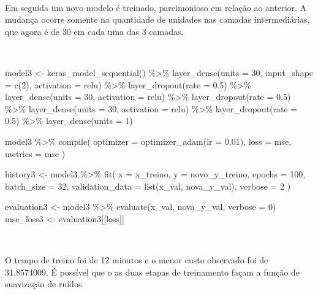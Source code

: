 \documentclass[
  a4paperpaper,
]{article}
\newenvironment{Shaded}{\begin{snugshade}}{\end{snugshade}}
\newcommand{\AttributeTok}[1]{\textcolor[rgb]{0.40,0.45,0.13}{#1}}
\newcommand{\DecValTok}[1]{\textcolor[rgb]{0.68,0.00,0.00}{#1}}
\newcommand{\FloatTok}[1]{\textcolor[rgb]{0.68,0.00,0.00}{#1}}
\newcommand{\FunctionTok}[1]{\textcolor[rgb]{0.28,0.35,0.67}{#1}}
\newcommand{\NormalTok}[1]{\textcolor[rgb]{0.00,0.23,0.31}{#1}}
\newcommand{\OtherTok}[1]{\textcolor[rgb]{0.00,0.23,0.31}{#1}}
\newcommand{\SpecialCharTok}[1]{\textcolor[rgb]{0.37,0.37,0.37}{#1}}
\newcommand{\StringTok}[1]{\textcolor[rgb]{0.13,0.47,0.30}{#1}}
\begin{document}
~

Em seguida um novo modelo é treinado, parcimonioso em relação ao
anterior. A mudança ocorre somente na quantidade de unidades nas camadas
intermediárias, que agora é de 30 em cada uma das 3 camadas.

~

\begin{Shaded}
\begin{Highlighting}[]
\NormalTok{model3 }\OtherTok{\textless{}{-}} \FunctionTok{keras\_model\_sequential}\NormalTok{() }\SpecialCharTok{\%\textgreater{}\%}
  \FunctionTok{layer\_dense}\NormalTok{(}\AttributeTok{units =} \DecValTok{30}\NormalTok{, }\AttributeTok{input\_shape =} \FunctionTok{c}\NormalTok{(}\DecValTok{2}\NormalTok{), }\AttributeTok{activation =} \StringTok{\textquotesingle{}relu\textquotesingle{}}\NormalTok{) }\SpecialCharTok{\%\textgreater{}\%}
  \FunctionTok{layer\_dropout}\NormalTok{(}\AttributeTok{rate =} \FloatTok{0.5}\NormalTok{) }\SpecialCharTok{\%\textgreater{}\%}  
  \FunctionTok{layer\_dense}\NormalTok{(}\AttributeTok{units =} \DecValTok{30}\NormalTok{, }\AttributeTok{activation =} \StringTok{\textquotesingle{}relu\textquotesingle{}}\NormalTok{) }\SpecialCharTok{\%\textgreater{}\%}
  \FunctionTok{layer\_dropout}\NormalTok{(}\AttributeTok{rate =} \FloatTok{0.5}\NormalTok{) }\SpecialCharTok{\%\textgreater{}\%}  
  \FunctionTok{layer\_dense}\NormalTok{(}\AttributeTok{units =} \DecValTok{30}\NormalTok{, }\AttributeTok{activation =} \StringTok{\textquotesingle{}relu\textquotesingle{}}\NormalTok{) }\SpecialCharTok{\%\textgreater{}\%}
  \FunctionTok{layer\_dropout}\NormalTok{(}\AttributeTok{rate =} \FloatTok{0.5}\NormalTok{) }\SpecialCharTok{\%\textgreater{}\%}  
  \FunctionTok{layer\_dense}\NormalTok{(}\AttributeTok{units =} \DecValTok{1}\NormalTok{)  }

\NormalTok{model3 }\SpecialCharTok{\%\textgreater{}\%} \FunctionTok{compile}\NormalTok{(}
  \AttributeTok{optimizer =} \FunctionTok{optimizer\_adam}\NormalTok{(}\AttributeTok{lr =} \FloatTok{0.01}\NormalTok{),}
  \AttributeTok{loss =} \StringTok{\textquotesingle{}mse\textquotesingle{}}\NormalTok{,}
  \AttributeTok{metrics =} \StringTok{\textquotesingle{}mse\textquotesingle{}}
\NormalTok{)}

\NormalTok{history3 }\OtherTok{\textless{}{-}}\NormalTok{ model3 }\SpecialCharTok{\%\textgreater{}\%} \FunctionTok{fit}\NormalTok{(}
  \AttributeTok{x =}\NormalTok{ x\_treino,}
  \AttributeTok{y =}\NormalTok{ novo\_y\_treino,}
  \AttributeTok{epochs =} \DecValTok{100}\NormalTok{,          }
  \AttributeTok{batch\_size =} \DecValTok{32}\NormalTok{,       }
  \AttributeTok{validation\_data =} \FunctionTok{list}\NormalTok{(x\_val, nova\_y\_val),  }
  \AttributeTok{verbose =} \DecValTok{2}
\NormalTok{)}

\NormalTok{evaluation3 }\OtherTok{\textless{}{-}}\NormalTok{ model3 }\SpecialCharTok{\%\textgreater{}\%} \FunctionTok{evaluate}\NormalTok{(x\_val, nova\_y\_val, }\AttributeTok{verbose =} \DecValTok{0}\NormalTok{)}
\NormalTok{mse\_loss3 }\OtherTok{\textless{}{-}}\NormalTok{ evaluation3[[}\StringTok{\textquotesingle{}loss\textquotesingle{}}\NormalTok{]]}
\end{Highlighting}
\end{Shaded}

~

O tempo de treino foi de 12 minutos e o menor custo observado foi de
31.8574009. É possível que o as duas etapas de treinamento façam a
função de suavização de ruídos.
\end{document}
